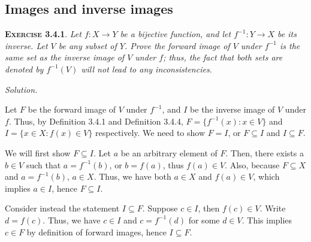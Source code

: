 \documentclass[12pt]{article}
\theoremstyle{remark}
\newenvironment{exer}[2]{
    \noindent \setlength{\parskip}{1em}%
    \textsc{\textbf{Exercise #1}}. \textit{#2} \par
    \noindent \textit{Solution.} %
}{\bigskip}
\begin{document}
\subsection{Images and inverse images}
\begin{exer}{3.4.1}{
    Let $f : X \to Y$ be a bijective function, and let $f^{-1} : Y \to X$ be its inverse.
    Let $V$ be any subset of $Y$.
    Prove the forward image of $V$ under $f^{-1}$ is the same set as the inverse image of $V$ under $f$; thus, the fact that both sets are denoted by $f^{-1}(V)$ will not lead to any inconsistencies.
}
    Let $F$ be the forward image of $V$ under $f^{-1}$, and $I$ be the inverse image of $V$ under $f$.
    Thus, by Definition 3.4.1 and Definition 3.4.4, $F = \{f^{-1}(x) : x \in V \}$ and $I = \{x \in X : f(x) \in V \}$ respectively.
    We need to show $F = I$, or $F \subseteq I$ and $I \subseteq F$.

    We will first show $F \subseteq I$.
    Let $a$ be an arbitrary element of $F$.
    Then, there exists a $b \in V$ such that $a = f^{-1}(b)$, or $b = f(a)$, thus $f(a) \in V$.
    Also, because $F \subseteq X$ and $a = f^{-1}(b)$, $a \in X$.
    Thus, we have both $a \in X$ and $f(a) \in V$, which implies $a \in I$, hence $F \subseteq I$.

    Consider instead the statement $I \subseteq F$.
    Suppose $c \in I$, then $f(c) \in V$.
    Write $d = f(c)$.
    Thus, we have $c \in I$ and $c = f^{-1}(d)$ for some $d \in V$.
    This implies $c \in F$ by definition of forward images, hence $I \subseteq F$.
\end{exer}
\end{document}
